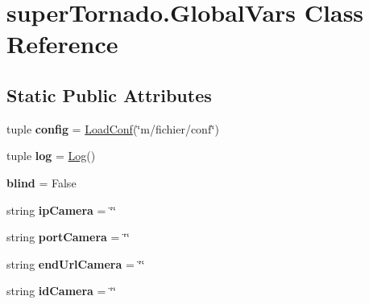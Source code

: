 \hypertarget{classsuper_tornado_1_1_global_vars}{\section{super\-Tornado.\-Global\-Vars Class Reference}
\label{classsuper_tornado_1_1_global_vars}
}
\subsection*{Static Public Attributes}
\begin{DoxyCompactItemize}
\item 
\hypertarget{classsuper_tornado_1_1_global_vars_a0091cf90c3955b9dd9917e441d6d307f}{tuple {\bfseries config} = \hyperlink{classm_1_1load_conf_1_1_load_conf}{Load\-Conf}(\char`\"{}m/fichier/conf\char`\"{})}\label{classsuper_tornado_1_1_global_vars_a0091cf90c3955b9dd9917e441d6d307f}

\item 
\hypertarget{classsuper_tornado_1_1_global_vars_a027c191330c93fb0ce920d0c0cd7b8b2}{tuple {\bfseries log} = \hyperlink{classm_1_1log_1_1_log}{Log}()}\label{classsuper_tornado_1_1_global_vars_a027c191330c93fb0ce920d0c0cd7b8b2}

\item 
\hypertarget{classsuper_tornado_1_1_global_vars_a88c8b1da2e0b050af8a379a117440a44}{{\bfseries blind} = False}\label{classsuper_tornado_1_1_global_vars_a88c8b1da2e0b050af8a379a117440a44}

\item 
\hypertarget{classsuper_tornado_1_1_global_vars_a90ce11ba50f379aeb590c8e75a72a440}{string {\bfseries ip\-Camera} = \char`\"{}\char`\"{}}\label{classsuper_tornado_1_1_global_vars_a90ce11ba50f379aeb590c8e75a72a440}

\item 
\hypertarget{classsuper_tornado_1_1_global_vars_a1ac437cbfa5d3a6d35b079411ee6fb0a}{string {\bfseries port\-Camera} = \char`\"{}\char`\"{}}\label{classsuper_tornado_1_1_global_vars_a1ac437cbfa5d3a6d35b079411ee6fb0a}

\item 
\hypertarget{classsuper_tornado_1_1_global_vars_a6e47041f62f9a703fc68916c2bb9cbe5}{string {\bfseries end\-Url\-Camera} = \char`\"{}\char`\"{}}\label{classsuper_tornado_1_1_global_vars_a6e47041f62f9a703fc68916c2bb9cbe5}

\item 
\hypertarget{classsuper_tornado_1_1_global_vars_ac11b9f2e40a970b6254a02a6683d0ea9}{string {\bfseries id\-Camera} = \char`\"{}\char`\"{}}\label{classsuper_tornado_1_1_global_vars_ac11b9f2e40a970b6254a02a6683d0ea9}


\end{DoxyCompactItemize}
